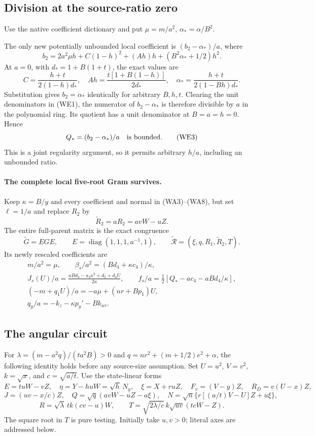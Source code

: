 \subsection{Division at the source-ratio zero}
\label{component:p296e824cb97a}
Use the native coefficient dictionary and put $\mu=m/a^2$,
$\alpha_*=\alpha/B^2$.

The only new potentially unbounded local coefficient is
$(b_2-\alpha_*)/a$, where
\[
 b_2=2a^2\mu h+C(1-h)^2+(Ah)h+(B^2\alpha_*+1/2)h^2.
\]
At $a=0$, with $d_*=1+B(1+t)$, the exact values are
\[
 C=\frac{h+t}{2(1-h)d_*},\quad
 Ah=\frac{t[1+B(1-h)]}{2d_*},\quad
 \alpha_* =\frac{h+t}{2(1-Bh)d_*}.
\]
Substitution gives $b_2=\alpha_*$ identically for arbitrary
$B,h,t$. Clearing the unit denominators in (WE1), the numerator
of $b_2-\alpha_*$ is therefore divisible by $a$ in the polynomial
ring. Its quotient has a unit denominator at $B=a=h=0$.
Hence
\[
 Q_*=(b_2-\alpha_*)/a\quad\hbox{is bounded}.       \tag{WE3}
\]
This is a joint regularity argument, so it permits arbitrary
$h/a$, including an unbounded ratio. 

\paragraph{The complete local five-root Gram survives.}
Keep $\kappa=B/y$ and every coefficient and normal in
(WA3)--(WA8), but set $\ell=1/a$ and replace $R_2$ by
\[
 \widetilde R_2=aR_2=avW-uZ.
\]
The entire full-parent matrix is the exact congruence
\[
 \widetilde G=EGE,\qquad E=\operatorname{diag}(1,1,1,a^{-1},1),
 \qquad \widetilde{\mathcal R}=(\xi,q,R_1,\widetilde R_2,T).
                                                               \tag{WE4}
\]
Its newly rescaled coefficients are
\[
\begin{gathered}
 m/a^2=\mu,\qquad
 \beta_s/a^2=(Bd_4+\kappa c_4)/\kappa,\\
 J_s(U)/a=\frac{aBd_4-a_4\kappa^2+d_2+d_4U}{2\kappa},\qquad
 f_s/a=\tfrac12[Q_*-ac_4-aBd_4/\kappa],\\
 (-m+q_1U)/a=-a\mu+(nr+Bp_1)U,\\
 q_y/a=-k_z-\kappa p_y'-Bk_{uv}.                  \end{gathered}\tag{WE5}
\]

\subsection{The angular circuit}
\label{sec:c2-short-angular-identity}
For $\lambda=(m-a^2q)/(ta^2B)>0$ and $q=nr^2+(m+1/2)e^2+\alpha$,
the following identity holds before any source-size assumption.
Set $U=u^2$, $V=v^2$, $k=\sqrt{x}$, and $c=\sqrt{a/t}$.
Use the state-linear forms
\[
 E=tuW-vZ,\quad \eta=Y-huW=\sqrt h\,N_y,\quad
 \xi=X+ruZ,\quad F_v=(V-y)Z,\quad R_D=v(U-x)Z,
\]
\[
 J=(uv-x/c)Z,\quad Q=\sqrt q(avW-uZ-a\xi),\quad
 N=\sqrt n\{r[(a/t)V-U]Z+u\xi\},
\]
\[
 R=\sqrt\lambda\,tk(cv-u)W,\qquad
 T=\sqrt{2\lambda/c}\,k\sqrt{uv}(tcW-Z).              \tag{BA4}
\]
The square root in $T$ is pure testing. Initially take $u,v>0$;
literal axes are addressed below.

